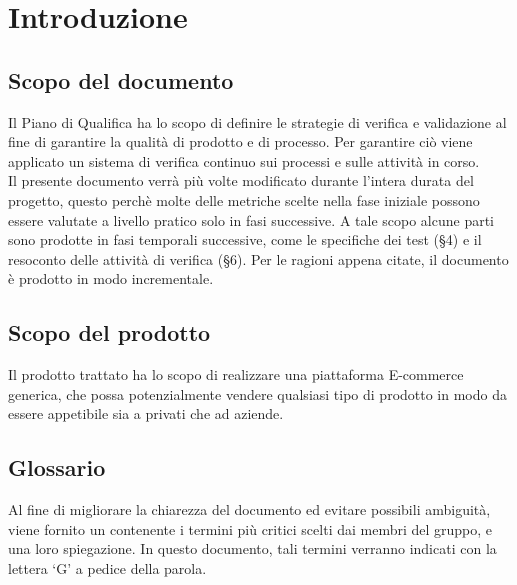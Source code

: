 \section{Introduzione}

\subsection{Scopo del documento}
Il Piano di Qualifica ha lo scopo di definire le strategie di verifica e validazione al fine di garantire la qualità di prodotto e di processo. Per garantire ciò viene applicato un sistema di verifica continuo sui processi e sulle attività in corso.\\
Il presente documento verrà più volte modificato durante l'intera durata del progetto, questo perchè molte delle metriche scelte nella fase iniziale possono essere valutate a livello pratico solo in fasi successive. A tale scopo alcune parti sono prodotte in fasi temporali successive, come le specifiche dei test (§4) e il resoconto delle attività di verifica (§6). Per le ragioni appena citate, il documento è prodotto in modo incrementale.

\subsection{Scopo del prodotto}
Il prodotto trattato ha lo scopo di realizzare una piattaforma E-commerce generica, che possa potenzialmente vendere qualsiasi tipo di prodotto in modo da essere appetibile sia a privati che ad aziende.

\subsection{Glossario}
Al fine di migliorare la chiarezza del documento ed evitare possibili ambiguità, viene fornito un
\Glossario{} contenente i termini più critici scelti dai membri del gruppo, e una loro spiegazione.
In questo documento, tali termini verranno indicati con la lettera `G’ a pedice della parola.

